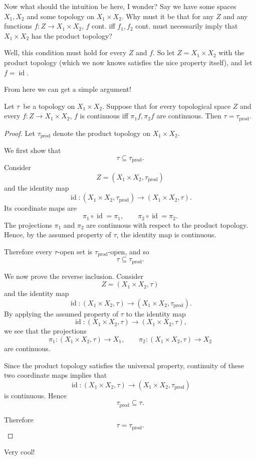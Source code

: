 Now what should the intuition be here, I wonder? 
Say we have some spaces $X_1, X_2$ and some topology on 
$X_1 \times X_2$. Why must it be that for any $Z$ and 
any 
functions $f : Z \to X_1 \times X_2$, 
$f$ cont. iff $f_1,f_2$ cont. must necessarily imply 
that $X_1\times X_2$ has the product topology? 

Well, this condition must hold for every $Z$ and $f$. So let 
$Z = X_1\times X_2$ with the product topology (which we 
now knows satisfies the nice property itself), and let 
$f = \operatorname{id}$. 

From here we can get a simple argument! 

\begin{thm*}
    Let $\tau$ be a topology on $X_1 \times X_2$. Suppose that 
    for every topological space $Z$ and every 
    $f : Z \to X_1 \times X_2$, $f$ is continuous iff 
    $\pi_1 f, \pi_2 f$ are continuous. Then 
    $\tau = \tau_{\mathrm{prod}}$. 
\end{thm*}
\begin{proof}
    Let $\tau_{\mathrm{prod}}$ denote the product topology on
    $X_1\times X_2$.

    We first show that
    \[
        \tau \subseteq \tau_{\mathrm{prod}}.
    \]
    Consider
    \[
        Z=(X_1\times X_2,\tau_{\mathrm{prod}})
    \]
    and the identity map
    \[
        \operatorname{id}:
        (X_1\times X_2,\tau_{\mathrm{prod}})
        \to
        (X_1\times X_2,\tau).
    \]
    Its coordinate maps are
    \[
        \pi_1\circ\operatorname{id}=\pi_1,
        \qquad
        \pi_2\circ\operatorname{id}=\pi_2.
    \]
    The projections $\pi_1$ and $\pi_2$ are continuous with respect
    to the product topology. Hence, by the assumed property of $\tau$,
    the identity map is continuous.

    Therefore every $\tau$-open set is
    $\tau_{\mathrm{prod}}$-open, and so
    \[
        \tau\subseteq\tau_{\mathrm{prod}}.
    \]

    We now prove the reverse inclusion. Consider
    \[
        Z=(X_1\times X_2,\tau)
    \]
    and the identity map
    \[
        \operatorname{id}:
        (X_1\times X_2,\tau)
        \to
        (X_1\times X_2,\tau_{\mathrm{prod}}).
    \]
    By applying the assumed property of $\tau$ to the identity map
    \[
        \operatorname{id}:
        (X_1\times X_2,\tau)
        \to
        (X_1\times X_2,\tau),
    \]
    we see that the projections
    \[
        \pi_1:(X_1\times X_2,\tau)\to X_1,
        \qquad
        \pi_2:(X_1\times X_2,\tau)\to X_2
    \]
    are continuous.

    Since the product topology satisfies the universal property,
    continuity of these two coordinate maps implies that
    \[
        \operatorname{id}:
        (X_1\times X_2,\tau)
        \to
        (X_1\times X_2,\tau_{\mathrm{prod}})
    \]
    is continuous. Hence
    \[
        \tau_{\mathrm{prod}}\subseteq\tau.
    \]

    Therefore
    \[
        \tau=\tau_{\mathrm{prod}}.
    \]
\end{proof}
Very cool! 

